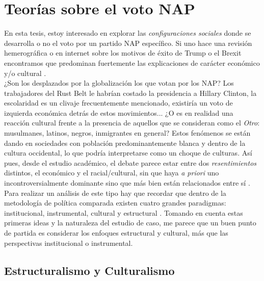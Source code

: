 \chapter{Teorías sobre el voto NAP}

En esta tesis, estoy interesado en explorar las \textit{configuraciones sociales} donde se desarrolla o no el voto por un partido NAP específico. Si uno hace una revisión hemerográfica o en internet sobre los motivos de éxito de Trump o el Brexit encontramos que predominan fuertemente las explicaciones de carácter económico y/o cultural \parencites{Beauchamp16a}{Beauchamp16b}{Carney16}{Tesler16}{Sides16} {Arnade16}.\\ 

¿Son los desplazados por la globalización los que votan por los NAP? Los trabajadores del Rust Belt le habrían costado la presidencia a Hillary Clinton, la escolaridad es un clivaje frecuentemente mencionado, existiría un voto de izquierda económica detrás de estos movimientos... ¿O es en realidad una reacción cultural frente a la presencia de aquellos que se consideran como el \textit{Otro}: musulmanes, latinos, negros, inmigrantes en general? Estos fenómenos se están dando en sociedades con población predominantemente blanca y dentro de la cultura occidental, lo que podría interpretarse como un choque de culturas. Así pues, desde el estudio académico, el debate parece estar entre dos \textit{resentimientos} distintos, el económico y el racial/cultural, sin que haya \textit{a priori} uno incontroversialmente dominante sino que más bien están relacionados entre sí \parencites{Inglehart16}{Ivarsflaten14}.\\ 

Para realizar un análisis de este tipo hay que recordar que dentro de la metodología de política comparada existen cuatro grandes paradigmas: institucional, instrumental, cultural y estructural \parencite{Uribe16}. Tomando en cuenta estas primeras ideas y la naturaleza del estudio de caso, me parece que un buen punto de partida es considerar los enfoques estructural y cultural, más que las perspectivas institucional o instrumental.  

\section{Estructuralismo y Culturalismo} 

